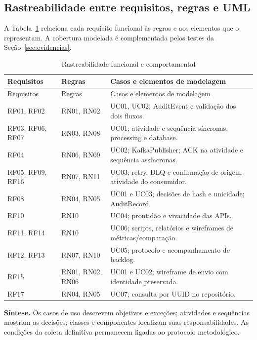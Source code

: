 \subsection{Rastreabilidade entre requisitos, regras e UML}
A Tabela~\ref{tab:rastreabilidade} relaciona cada requisito funcional às regras e aos elementos que o representam. A cobertura modelada é complementada pelos testes da Seção~\ref{sec:evidencias}.
{\small
\begin{longtable}{p{}p{}p{}}
\caption{Rastreabilidade funcional e comportamental}\label{tab:rastreabilidade}\\
\hline Requisitos & Regras & Casos e elementos de modelagem\\ \hline
\endfirsthead
\hline Requisitos & Regras & Casos e elementos de modelagem\\ \hline
\endhead
RF01, RF02 & RN01, RN02 & UC01, UC02; AuditEvent e validação dos dois fluxos.\\ \hline
RF03, RF06, RF07 & RN03, RN08 & UC01; atividade e sequência síncronas; processing e database.\\ \hline
RF04 & RN06, RN09 & UC02; KafkaPublisher; ACK na atividade e sequência assíncronas.\\ \hline
RF05, RF09, RF16 & RN07, RN11 & UC03; retry, DLQ e confirmação de origem; atividade do consumidor.\\ \hline
RF08 & RN04, RN05 & UC01 e UC03; decisões de hash e unicidade; AuditRecord.\\ \hline
RF10 & RN10 & UC04; prontidão e vivacidade das APIs.\\ \hline
RF11, RF14 & RN10 & UC06; scripts, relatórios e wireframes de métricas/comparação.\\ \hline
RF12, RF13 & RN07, RN10 & UC05; protocolo e acompanhamento de backlog.\\ \hline
RF15 & RN01, RN02, RN06 & UC01 e UC02; wireframe de envio com identidade preservada.\\ \hline
RF17 & RN04, RN05 & UC07; consulta por UUID no repositório.\\ \hline
\end{longtable}
\par
}
\textbf{Síntese.} Os casos de uso descrevem objetivos e exceções; atividades e sequências mostram as decisões; classes e componentes localizam suas responsabilidades. As condições da coleta definitiva permanecem ligadas ao protocolo metodológico.
